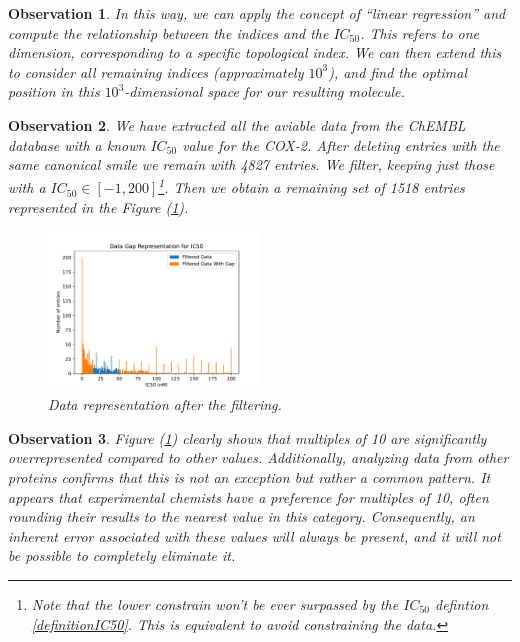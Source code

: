 \documentclass[12pt,letterpaper]{article}
\newtheorem{observation}{Observation}
\begin{document}
\begin{multicols}{2}
\begin{observation}
In this way, we can apply the concept of “linear regression” and compute the relationship between the indices and the $IC_{50}$. This refers to one dimension, corresponding to a specific topological index. We can then extend this to consider all remaining indices (approximately $10^3$), and find the optimal position in this $10^3$-dimensional space for our resulting molecule.
\end{observation}

\begin{observation}
We have extracted all the aviable data from the \emph{ChEMBL} database with a known $IC_{50}$ value for the COX-2. After deleting  entries with the same canonical smile we remain with 4827 entries. We filter, keeping just those with a $IC_{50}\in [-1,200]$\footnote{Note that the lower constrain won't be ever surpassed by the $IC_{50}$ defintion \ref{definitionIC50}. This is equivalent to avoid constraining the data.}. Then we obtain a remaining set of 1518 entries represented in the Figure (\ref{figDataRepresentationFiltering}).
\begin{figure}[H]
\centering
\includegraphics[width = 0.5\textwidth]{../Plots/DataGapRepresentationIC50percentageEresed25.0Gap_min_15Gap_max_50.pdf}
\caption{Data representation after the filtering.}
\label{figDataRepresentationFiltering}
\end{figure}
\end{observation}

\begin{observation}
Figure (\ref{figDataRepresentationFiltering}) clearly shows that multiples of 10 are significantly overrepresented compared to other values. Additionally, analyzing data from other proteins confirms that this is not an exception but rather a common pattern. It appears that experimental chemists have a preference for multiples of 10, often rounding their results to the nearest value in this category. Consequently, an inherent error associated with these values will always be present, and it will not be possible to completely eliminate it.
\end{observation}


\end{multicols}
\end{document}

